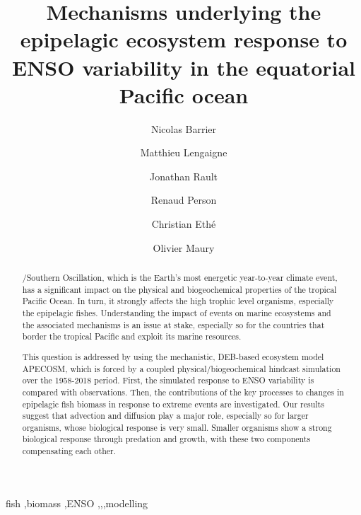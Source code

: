 \documentclass[review, 12pt]{elsarticle}
\begin{document}
\begin{frontmatter}

\title{Mechanisms underlying the epipelagic ecosystem response to ENSO variability in the equatorial Pacific ocean}

\author[mymainaddress]{Nicolas Barrier}

\author[mymainaddress]{Matthieu Lengaigne}
\author[mymainaddress]{Jonathan Rault}
\author[renaud]{Renaud Person}
\author[chris]{Christian Eth\'{e}}
\author[mymainaddress]{Olivier Maury}


\address[mymainaddress]{MARBEC, Univ. Montpellier, CNRS, Ifremer, IRD, Sète, France}
\address[renaud]{LOCEAN, IRD}
\address[chris]{IPSL, CNRS}

\begin{abstract}

\nino{}/Southern Oscillation, which is the Earth’s most energetic year-to-year climate event, has a significant impact on the physical and biogeochemical properties
of the tropical Pacific Ocean. In turn, it strongly affects the high trophic level organisms, especially the epipelagic fishes. 
Understanding the impact of \nino{} events on marine ecosystems and the associated mechanisms is an issue at stake, especially so for the countries that border the tropical Pacific and exploit its marine resources.

This question is addressed by using the mechanistic, DEB-based ecosystem model APECOSM, which is forced by a coupled physical/biogeochemical hindcast simulation over the 1958-2018 period. First, the simulated response to ENSO variability is compared with observations. Then, the contributions of the key processes to changes in epipelagic fish biomass in response to extreme \nino{} events are investigated. Our results suggest that advection and diffusion play a major role, especially so for larger organisms, whose biological response is very small. Smaller organisms show a strong biological response through predation and growth, with these two components compensating each other. 

\end{abstract}

\begin{keyword}
fish \sep biomass \sep ENSO \sep \nino \sep \nina \sep modelling
\end{keyword}

\end{frontmatter}
\end{document}
